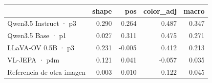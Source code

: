 \begin{tabular}{lrrrr}
\toprule
 & shape & pos & color\_adj & macro \\
\midrule
Qwen3.5 Instruct · p3 & 0.290 & 0.264 & 0.487 & 0.347 \\
Qwen3.5 Base · p1 & 0.027 & 0.311 & 0.475 & 0.271 \\
LLaVA-OV 0.5B · p3 & 0.231 & -0.005 & 0.412 & 0.213 \\
VL-JEPA · p4m & 0.121 & 0.041 & -0.057 & 0.035 \\
Referencia de otra imagen & -0.003 & -0.010 & -0.122 & -0.045 \\
\bottomrule
\end{tabular}

